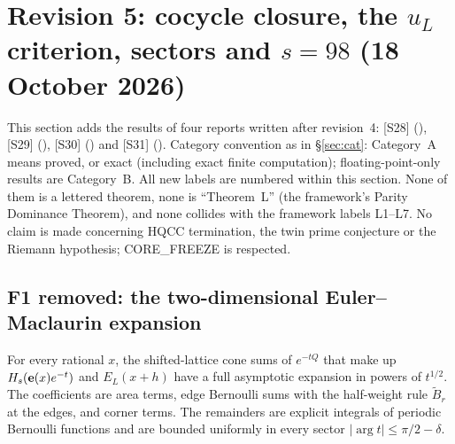 \section{Revision 5: cocycle closure, the $u_L$ criterion, sectors and $s=98$ (18 October 2026)}\label{sec:rev5}
This section adds the results of four reports written after revision~4: [S28] (), [S29]
(), [S30] () and [S31] ().
Category convention as in \S\ref{sec:cat}: Category~A means proved, or exact (including exact finite computation); floating-point-only results are Category~B.
All new labels are numbered within this section. None of them is a lettered theorem, none is ``Theorem~L'' (the framework's Parity Dominance Theorem), and none
collides with the framework labels L1--L7. No claim is made concerning HQCC termination, the twin prime conjecture or the Riemann hypothesis; CORE\_FREEZE is respected.

\subsection{F1 removed: the two-dimensional Euler--Maclaurin expansion}\label{sec:rev5F1}
\begin{proposition}\label{prop:EM5}
For every rational $x$, the shifted-lattice cone sums of $e^{-tQ}$ that make up $H_s(\mathbf{e}(x)e^{-t})$ and $E_L(x+h)$ have a full asymptotic expansion in powers of
$t^{1/2}$. The coefficients are area terms, edge Bernoulli sums with the half-weight rule $\tilde B_r$ at the edges, and corner terms. The remainders are explicit integrals of periodic Bernoulli functions and are bounded uniformly in every sector $|\arg t|\le\pi/2-\delta$.
\end{proposition}


